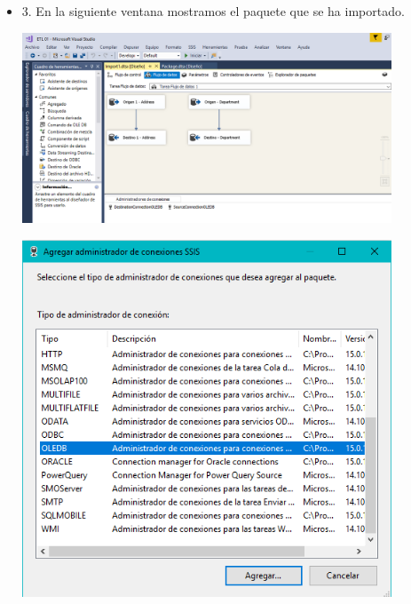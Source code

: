 \begin{itemize}
\item 3. En la siguiente ventana mostramos el paquete que se ha importado.\\
	\begin{center}
	\includegraphics[width=11cm]{./Imagenes/img17}
	\end{center}	
	\begin{center}
	\includegraphics[width=11cm]{./Imagenes/img18}
	\end{center}	


\end{itemize}
